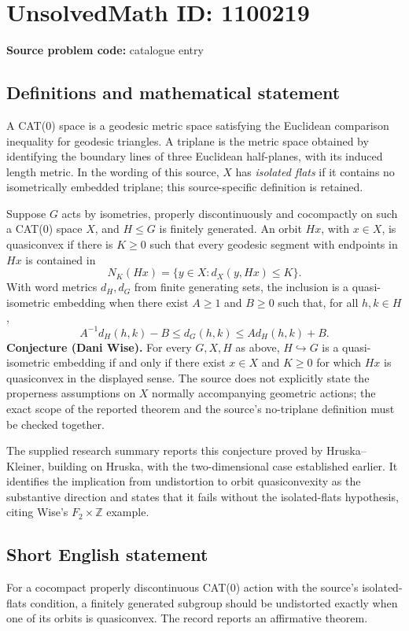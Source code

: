 \documentclass[11pt]{article}
\begin{document}
\section*{UnsolvedMath ID: 1100219}
\textbf{Source problem code:} catalogue entry
\subsection{Definitions and mathematical statement}
A CAT(0) space is a geodesic metric space satisfying the Euclidean comparison inequality for geodesic triangles. A triplane is the metric space obtained by identifying the boundary lines of three Euclidean half-planes, with its induced length metric. In the wording of this source, $X$ has \emph{isolated flats} if it contains no isometrically embedded triplane; this source-specific definition is retained.

Suppose $G$ acts by isometries, properly discontinuously and cocompactly on such a CAT(0) space $X$, and $H\leq G$ is finitely generated. An orbit $Hx$, with $x\in X$, is quasiconvex if there is $K\geq0$ such that every geodesic segment with endpoints in $Hx$ is contained in
\[
N_K(Hx)=\{y\in X:d_X(y,Hx)\leq K\}.
\]
With word metrics $d_H,d_G$ from finite generating sets, the inclusion is a quasi-isometric embedding when there exist $A\geq1$ and $B\geq0$ such that, for all $h,k\in H$,
\[
A^{-1}d_H(h,k)-B\leq d_G(h,k)\leq A d_H(h,k)+B.
\]
\textbf{Conjecture (Dani Wise).} For every $G,X,H$ as above, $H\hookrightarrow G$ is a quasi-isometric embedding if and only if there exist $x\in X$ and $K\geq0$ for which $Hx$ is quasiconvex in the displayed sense. The source does not explicitly state the properness assumptions on $X$ normally accompanying geometric actions; the exact scope of the reported theorem and the source's no-triplane definition must be checked together.

The supplied research summary reports this conjecture proved by Hruska--Kleiner, building on Hruska, with the two-dimensional case established earlier. It identifies the implication from undistortion to orbit quasiconvexity as the substantive direction and states that it fails without the isolated-flats hypothesis, citing Wise's $F_2\times\mathbb Z$ example.
\subsection{Short English statement}
For a cocompact properly discontinuous CAT(0) action with the source's isolated-flats condition, a finitely generated subgroup should be undistorted exactly when one of its orbits is quasiconvex. The record reports an affirmative theorem.
\end{document}
